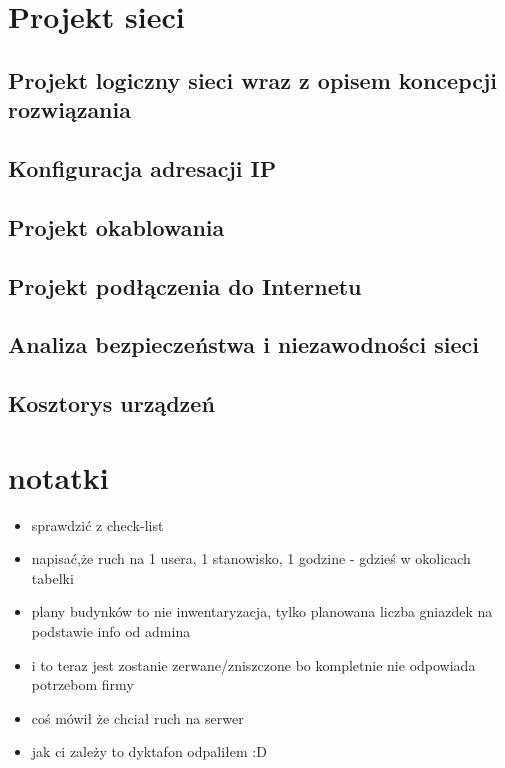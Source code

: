 \documentclass{report}
\begin{document}
\chapter{Projekt sieci}
\section{Projekt logiczny sieci wraz z opisem koncepcji rozwiązania}
\section{Konfiguracja adresacji IP}
\section{Projekt okablowania}
\section{Projekt podłączenia do Internetu}
\section{Analiza bezpieczeństwa i niezawodności sieci}
\section{Kosztorys urządzeń}



\chapter*{notatki}

\begin{itemize}

\item sprawdzić z check-list
\item napisać,że ruch na 1 usera, 1 stanowisko, 1 godzine - gdzieś w okolicach tabelki
\item plany budynków to nie inwentaryzacja, tylko planowana liczba gniazdek na podstawie info od admina
\item i to teraz jest zostanie zerwane/zniszczone bo kompletnie nie odpowiada potrzebom firmy
\item coś mówił że chciał ruch na serwer
\item jak ci zależy to dyktafon odpaliłem :D


 
\end{itemize}
\end{document}
